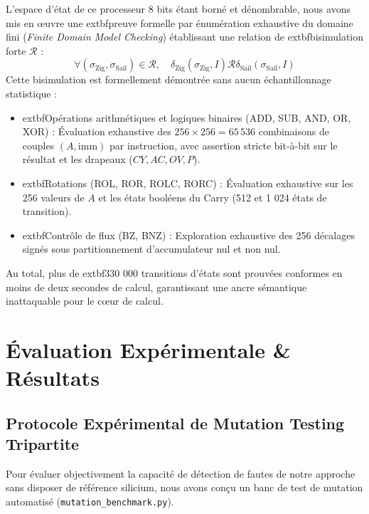 \documentclass[10pt,journal,compsoc]{IEEEtran}
\begin{document}
L'espace d'état de ce processeur 8 bits étant borné et dénombrable, nous avons mis en œuvre une 	extbf{preuve formelle par énumération exhaustive du domaine fini} (\textit{Finite Domain Model Checking}) établissant une relation de 	extbf{bisimulation forte} $\mathcal{R}$ :
\begin{equation}
\forall (\sigma_{\text{Zig}}, \sigma_{\text{Sail}}) \in \mathcal{R}, \quad \delta_{\text{Zig}}(\sigma_{\text{Zig}}, I) \mathrel{\mathcal{R}} \delta_{\text{Sail}}(\sigma_{\text{Sail}}, I)
\end{equation}
Cette bisimulation est formellement démontrée sans aucun échantillonnage statistique :
\begin{itemize}
    \item 	extbf{Opérations arithmétiques et logiques binaires (ADD, SUB, AND, OR, XOR) :} Évaluation exhaustive des $256 \times 256 = 65\,536$ combinaisons de couples $(A, \text{imm})$ par instruction, avec assertion stricte bit-à-bit sur le résultat et les drapeaux ($CY, AC, OV, P$).
    \item 	extbf{Rotations (ROL, ROR, ROLC, RORC) :} Évaluation exhaustive sur les 256 valeurs de $A$ et les états booléens du Carry (512 et 1 024 états de transition).
    \item 	extbf{Contrôle de flux (BZ, BNZ) :} Exploration exhaustive des 256 décalages signés sous partitionnement d'accumulateur nul et non nul.
\end{itemize}

Au total, plus de 	extbf{330 000 transitions d'états} sont prouvées conformes en moins de deux secondes de calcul, garantissant une ancre sémantique inattaquable pour le cœur de calcul.

\section{Évaluation Expérimentale \& Résultats}

\subsection{Protocole Expérimental de Mutation Testing Tripartite}
Pour évaluer objectivement la capacité de détection de fautes de notre approche sans disposer de référence silicium, nous avons conçu un banc de test de mutation automatisé (\texttt{mutation\_benchmark.py}).
\end{document}
